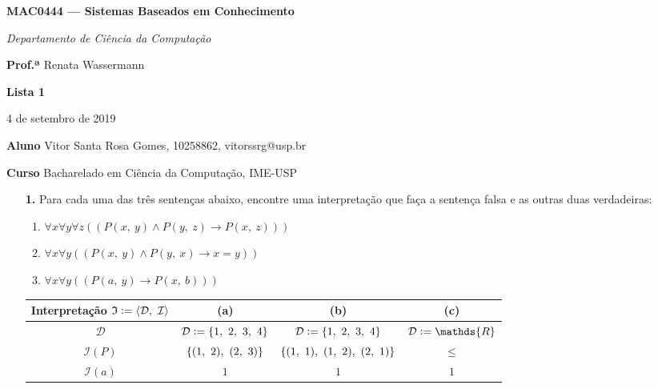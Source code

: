 \documentclass[10pt, twoside]{article}          %
\let\oldphantom\vphantom
\let\vphantom\relax
\let\vphantom\oldphantom
\newcommand{\Reals}{\mathds{R}}                 %
\newcommand{\defeq}{\vcentcolon=}               %
\renewcommand{\l}{\mathopen{}\left}             %
\renewcommand{\r}{\vphantom{1j}\right}          %
\newcommand{\triple}[4]{%
  \parbox{.333#4}{#1\hfill}%
  \parbox{.333#4}{\hfil#2\hfil}%
  \parbox{.333#4}{\hfill#3}%
}                                               %
\newenvironment{proof*}[1][proof*]              %
  {\proof[#1]\vspace{0.5em}\vspace*{-\baselineskip}
  \hspace{\parindent}\leftskip=.5cm\rightskip=.5cm}
  {\vspace*{-1.5\baselineskip}
  
  \rightskip=0cm\endproof}
\begin{document}
\begin{multicols*}{2}
\setlength{\columnseprule}{0.4pt}

\begin{center}
  \textbf{\large MAC0444 --- Sistemas Baseados em Conhecimento}

  \textit{Departamento de Ciência da Computação}

  \bigskip
  \triple{\textbf{Prof.ª} Renata Wassermann}{\textbf{Lista 1}}{4 de setembro de 2019}{\columnwidth}

  \bigskip
  {\bf Aluno} Vitor Santa Rosa Gomes, 10258862, vitorssrg@usp.br

  {\bf Curso} Bacharelado em Ciência da Computação, IME-USP
\end{center}

\begin{enumerate}
  \renewcommand{\b}{\overline}
  \newcommand{\s}{\smash}
  \newcommand{\lxor}{\mathbin{\,\underline{\!\vee\!}\,}}

  \item[\textbf{1.}] Para cada uma das três sentenças abaixo, encontre uma interpretação que faça a 
  sentença falsa e as outras duas verdadeiras:
  \begin{proof*}[\unskip\nopunct]
    \begin{enumerate}
      \item $\forall x \forall y \forall z((P(x,\ y)\land P(y,\ z) \rightarrow P(x,\ z)))$
      \item $\forall x \forall y((P(x,\ y)\land P(y,\ x) \rightarrow x=y))$
      \item $\forall x \forall y((P(a,\ y)\rightarrow P(x,\ b)))$
    \end{enumerate}
    \begin{tabular}{c|ccc}
        Interpretação $\mathfrak{I} \defeq \l\langle\mathcal{D},\ \mathcal{I}\r\rangle$
      & \textbf{(a)}
      & \textbf{(b)}
      & \textbf{(c)}
      \\ \hline

        $\mathcal{D}$
      & $\mathcal{D}\defeq\l\{1,\ 2,\ 3,\ 4\r\}$
      & $\mathcal{D}\defeq\l\{1,\ 2,\ 3,\ 4\r\}$
      & $\mathcal{D}\defeq\Reals$
      \\

        $\mathcal{I}(P)$
      & $\l\{(1,\ 2),\ (2,\ 3)\r\}$
      & $\l\{(1,\ 1),\ (1,\ 2),\ (2,\ 1)\r\}$
      & $\leq$
      \\

        $\mathcal{I}(a)$
      & $1$
      & $1$
      & $1$
      \\


\end{tabular}
\end{proof*}
\end{enumerate}
\end{multicols*}
\end{document}
